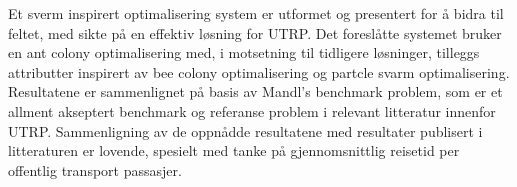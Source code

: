Et sverm inspirert optimalisering system er utformet og presentert for å bidra til feltet, med sikte på en effektiv løsning for UTRP. Det foreslåtte systemet bruker en ant colony optimalisering med, i motsetning til tidligere løsninger, tilleggs attributter inspirert av bee colony optimalisering og partcle svarm optimalisering. Resultatene er sammenlignet på basis av Mandl's benchmark problem, som er et allment akseptert benchmark og referanse problem i relevant litteratur innenfor UTRP. Sammenligning av de oppnådde resultatene med resultater publisert i litteraturen er lovende, spesielt med tanke på gjennomsnittlig reisetid per offentlig transport passasjer.
